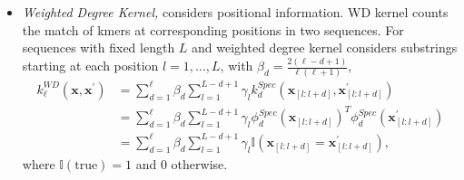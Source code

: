 \documentclass{scrartcl}[2013/05/29]%
\begin{document}
\begin{itemize}
    \item \textit{Weighted Degree Kernel,} considers positional information. WD kernel counts the match of kmers at corresponding positions in two sequences.
    For sequences with fixed length $L$ and weighted degree kernel considers substrings starting at each position $l = 1, ..., L$, with $\beta_d = \frac{2(\ell - d + 1)}{\ell(\ell+1)}$, \\
    \begin{align}
        k_\ell^{WD}(\mathbf{x}, \mathbf{x}^\prime) 
        &= \sum_{d=1}^{\ell} \beta_d \sum_{l=1}^{L-d+1} \gamma_l k_d^{Spec}(\mathbf{x}_{[l:l+d]}, \mathbf{x}_{[l:l+d]}^\prime)\\
        &= \sum_{d=1}^{\ell} \beta_d \sum_{l=1}^{L-d+1} \gamma_l \phi_d^{Spec}(\mathbf{x}_{[l:l+d]})^T \phi_d^{Spec}(\mathbf{x}_{[l:l+d]}^\prime)\\
        &= \sum_{d=1}^{\ell} \beta_d \sum_{l=1}^{L-d+1} \gamma_l \mathbb{I}(\mathbf{x}_{[l:l+d]} = \mathbf{x}_{[l:l+d]}^\prime),
    \end{align}
    where $\mathbb{I}(\text{true}) = 1$ and 0 otherwise. 
    
\end{itemize}
\end{document}

